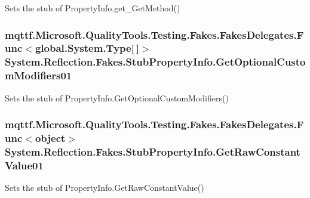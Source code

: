 Sets the stub of Property\-Info.\-get\-\_\-\-Get\-Method()

\hypertarget{class_system_1_1_reflection_1_1_fakes_1_1_stub_property_info_a68f4fdf141b7d82e6205f7c902e10069}{
\subsubsection[{Get\-Optional\-Custom\-Modifiers01}]{\setlength{\rightskip}{0pt plus 5cm}mqttf.\-Microsoft.\-Quality\-Tools.\-Testing.\-Fakes.\-Fakes\-Delegates.\-Func$<$global.\-System.\-Type\mbox{[}$\,$\mbox{]}$>$ System.\-Reflection.\-Fakes.\-Stub\-Property\-Info.\-Get\-Optional\-Custom\-Modifiers01}}\label{class_system_1_1_reflection_1_1_fakes_1_1_stub_property_info_a68f4fdf141b7d82e6205f7c902e10069}


Sets the stub of Property\-Info.\-Get\-Optional\-Custom\-Modifiers()

\hypertarget{class_system_1_1_reflection_1_1_fakes_1_1_stub_property_info_afba6c33fe9a77258c82b2d86244ff09f}{
\subsubsection[{Get\-Raw\-Constant\-Value01}]{\setlength{\rightskip}{0pt plus 5cm}mqttf.\-Microsoft.\-Quality\-Tools.\-Testing.\-Fakes.\-Fakes\-Delegates.\-Func$<$object$>$ System.\-Reflection.\-Fakes.\-Stub\-Property\-Info.\-Get\-Raw\-Constant\-Value01}}\label{class_system_1_1_reflection_1_1_fakes_1_1_stub_property_info_afba6c33fe9a77258c82b2d86244ff09f}


Sets the stub of Property\-Info.\-Get\-Raw\-Constant\-Value()

